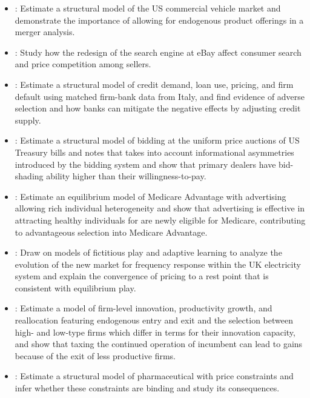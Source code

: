 \documentclass[
]{book}
\begin{document}
\begin{itemize}
\item
  \citet{wollmannTrucksBailoutsEquilibrium2018}: Estimate a structural model of the US commercial vehicle market and demonstrate the importance of allowing for endogenous product offerings in a merger analysis.
\item
  \citet{dinersteinConsumerPriceSearch2018}: Study how the redesign of the search engine at eBay affect consumer search and price competition among sellers.
\item
  \citet{crawfordAsymmetricInformationImperfect2018}: Estimate a structural model of credit demand, loan use, pricing, and firm default using matched firm-bank data from Italy, and find evidence of adverse selection and how banks can mitigate the negative effects by adjusting credit supply.
\item
  \citet{hortacsuBidShadingBidder2018}: Estimate a structural model of bidding at the uniform price auctions of US Treasury bills and notes that takes into account informational asymmetries introduced by the bidding system and show that primary dealers have bid-shading ability higher than their willingness-to-pay.
\item
  \citet{aizawaAdvertisingRiskSelection2018}: Estimate an equilibrium model of Medicare Advantage with advertising allowing rich individual heterogeneity and show that advertising is effective in attracting healthy individuals for are newly eligible for Medicare, contributing to advantageous selection into Medicare Advantage.
\item
  \citet{doraszelskiJustStartingOut2018}: Draw on models of fictitious play and adaptive learning to analyze the evolution of the new market for frequency response within the UK electricity system and explain the convergence of pricing to a rest point that is consistent with equilibrium play.
\item
  \citet{acemogluInnovationReallocationGrowth2018}: Estimate a model of firm-level innovation, productivity growth, and reallocation featuring endogenous entry and exit and the selection between high- and low-type firms which differ in terms for their innovation capacity, and show that taxing the continued operation of incumbent can lead to gains because of the exit of less productive firms.
\item
  \citet{duboisIdentifyingIndustryMargins2018}: Estimate a structural model of pharmaceutical with price constraints and infer whether these constraints are binding and study its consequences.

\end{itemize}
\end{document}
